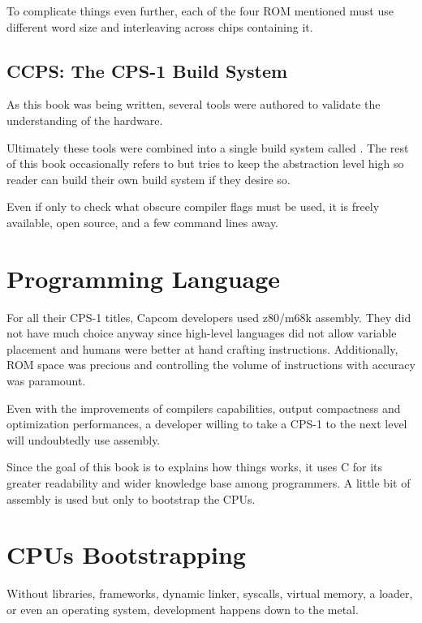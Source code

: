 To complicate things even further, each of the four ROM mentioned must use different word size and interleaving across chips containing it.

\subsection{CCPS: The CPS-1 Build System}
As this book was being written, several tools were authored to validate the understanding of the hardware.

Ultimately these tools were combined into a single build system called . The rest of this book occasionally refers to  but tries to keep the abstraction level high so reader can build their own build system if they desire so. 

Even if only to check what obscure compiler flags must be used, it is freely available, open source, and a few command lines away.






\section{Programming Language}
For all their CPS-1 titles, Capcom developers used z80/m68k assembly. They did not have much choice anyway since high-level languages did not allow variable placement and humans were better at hand crafting instructions. Additionally, ROM space was precious and controlling the volume of instructions with accuracy was paramount.

Even with the improvements of compilers capabilities, output compactness and optimization performances, a developer willing to take a CPS-1 to the next level will undoubtedly use assembly.

Since the goal of this book is to explains how things works, it uses C for its greater readability and wider knowledge base among programmers. A little bit of assembly is used but only to bootstrap the CPUs.
	
\section{CPUs Bootstrapping}
Without libraries, frameworks, dynamic linker, syscalls, virtual memory, a loader, or even an operating system, development happens down to the metal. 

